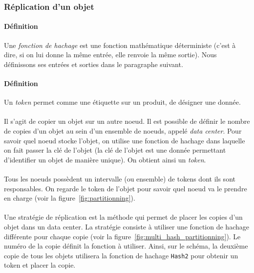 \documentclass[12pt]{article}
\begin{document}
\subsubsection{Réplication d'un objet}


\paragraph{Définition} Une \textit{fonction de hachage} est une fonction mathématique déterministe (c'est à dire, si on lui donne la même entrée, elle renvoie la même sortie). Nous définissons ses entrées et sorties dans le paragraphe suivant.

\paragraph{Définition} Un \textit{token} permet comme une étiquette sur un produit, de désigner une donnée.

\paragraph{} Il s'agit de copier un objet sur un autre noeud. 
Il est possible de définir le nombre de copies d'un objet au sein d'un ensemble de noeuds, appelé \textit{data center}. 
Pour savoir quel noeud stocke l'objet, on utilise une fonction de hachage dans laquelle on fait passer la clé de l'objet (la clé de l'objet est une donnée permettant d'identifier un objet de manière unique).
On obtient ainsi un \textit{token}.

\paragraph{} Tous les noeuds possèdent un intervalle (ou ensemble) de tokens dont ils sont responsables. 
On regarde le token de l'objet pour savoir quel noeud va le prendre en charge (voir la figure~\ref{fig:partitionning}).

\paragraph{} Une stratégie de réplication est la méthode qui permet de placer les copies d'un objet dans un data center.
La stratégie consiste à utiliser une fonction de hachage différente pour chaque copie (voir la figure~\ref{fig:multi_hash_partitionning}). 
Le numéro de la copie définit la fonction à utiliser. 
Ainsi, sur le schéma, la deuxième copie de tous les objets utilisera la fonction de hachage \texttt{Hash2} pour obtenir un token et placer la copie.
\end{document}
